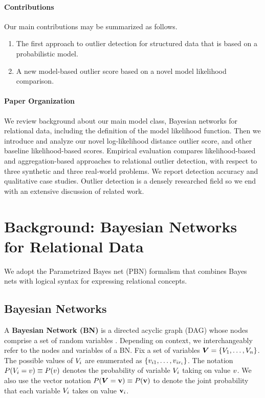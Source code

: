 \documentclass[conference]{IEEEtran}
\begin{document}
\paragraph{Contributions} Our main contributions may be 
 summarized as follows.

\begin{enumerate} 
	\item The first approach to outlier detection for structured data that is based on a probabilistic model. 
	\item A new model-based outlier score based on a novel model likelihood comparison.   
	\end{enumerate}

\paragraph{Paper Organization} We review background about our main model class, Bayesian networks for relational data, including the definition of the model likelihood function. Then we introduce and analyze our novel log-likelihood distance outlier score, and other baseline likelihood-based scores. Empirical evaluation compares likelihood-based and aggregation-based approaches to relational outlier detection, with respect to three synthetic and three real-world problems. We report detection accuracy and qualitative case studies. Outlier detection is a densely researched field so we end with an extensive discussion of related work.


\section{Background: Bayesian Networks for Relational Data}
We adopt  
 the Parametrized Bayes net (PBN) formalism \cite{Poole2003} that combines Bayes nets with logical syntax for expressing relational concepts. 

 
\subsection{Bayesian Networks}

A {\bf Bayesian Network (BN)} is a directed acyclic graph (DAG) whose nodes comprise a set of random variables \cite{Pearl1988}. Depending on context, we interchangeably refer to the nodes  and variables of a BN. Fix a set of variables $\boldsymbol{V} = \{V_{1},\ldots,V_{n}\}$. 
The possible values of $V_{i}$ are enumerated as $\{v_{i1},\ldots,v_{ir_{i}}\}$. The notation $P(V_{i} = v)\equiv P(v)$ denotes the probability of variable $V_{i}$ taking on value $v$. We also use the vector notation $P(\boldsymbol{V} = \mathbf{v}) \equiv P(\mathbf{v})$ to denote the joint probability that each variable $V_{i}$ takes on value $\mathbf{v}_{i}$. 
\end{document}
